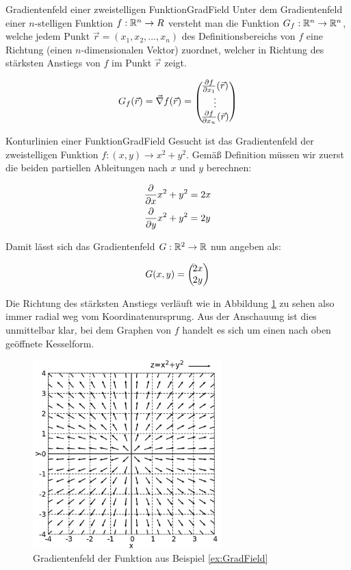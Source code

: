 \begin{definition}{Gradientenfeld einer zweistelligen Funktion}{GradField}
    Unter dem Gradientenfeld einer $n$-stelligen Funktion $f: \mathbb{R}^n \to R$ versteht man die Funktion $G_f: \mathbb{R}^n \to \mathbb{R}^n$, welche jedem Punkt $\vec{r}=(x_1,x_2,...,x_n)$ des Definitionsbereichs von $f$ eine Richtung (einen $n$-dimensionalen Vektor) zuordnet, welcher in Richtung des stärksten Anstiegs von $f$ im Punkt $\vec{r}$ zeigt.

    $$
        G_f(\vec{r}) = \vec\nabla f(\vec{r}) = \left(\negthinspace\begin{matrix}\frac{\partial f}{\partial x_1}(\vec{r})\\\vdots\\\frac{\partial f}{\partial x_n}(\vec{r})\end{matrix}\right)
    $$
\end{definition}

\begin{example}{Konturlinien einer Funktion}{GradField}
    Gesucht ist das Gradientenfeld der zweistelligen Funktion $f: (x,y) \to x^2+y^2$. Gemäß Definition müssen wir zuerst die beiden partiellen Ableitungen nach $x$ und $y$ berechnen:

    \begin{alignat*}{1}
        \frac{\partial }{\partial x} x^2+y^2 &= 2x \\
        \frac{\partial }{\partial y} x^2+y^2 &= 2y
    \end{alignat*}

    Damit lässt sich das Gradientenfeld $G: \mathbb{R}^2 \to \mathbb{R}$ nun angeben als:

    $$
        G(x,y) = \left(\negthinspace\begin{matrix}2x\\2y\end{matrix}\right)
    $$

    Die Richtung des stärksten Anstiegs verläuft wie in Abbildung \ref{fig:ExGradField} zu sehen also immer radial weg vom Koordinatenursprung. Aus der Anschauung ist dies unmittelbar klar, bei dem Graphen von $f$ handelt es sich um einen nach oben geöffnete Kesselform.
\end{example}

\begin{figure}[h]
    \caption{Gradientenfeld der Funktion aus Beispiel \ref{ex:GradField}}
    \label{fig:ExGradField}
    \centering
    \includegraphics[width=0.65\textwidth]{./gnuplot/example-gradient-field.png}
\end{figure}

